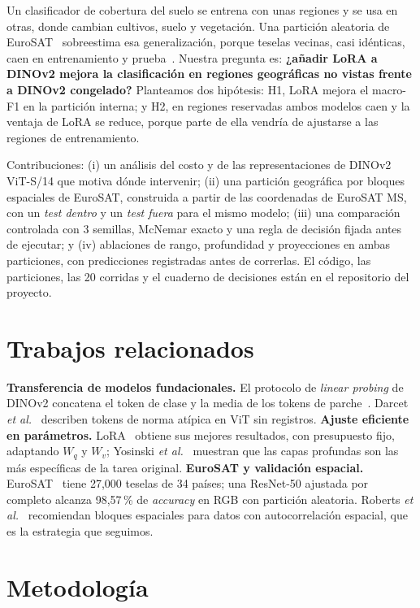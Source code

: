 \documentclass[conference,a4paper]{IEEEtran}
\begin{document}
Un clasificador de cobertura del suelo se entrena con unas regiones y se usa en otras, donde cambian cultivos, suelo y vegetación. Una partición aleatoria de EuroSAT~\cite{helber2019} sobreestima esa generalización, porque teselas vecinas, casi idénticas, caen en entrenamiento y prueba~\cite{roberts2017}. Nuestra pregunta es: \textbf{¿añadir LoRA a DINOv2 mejora la clasificación en regiones geográficas no vistas frente a DINOv2 congelado?} Planteamos dos hipótesis: H1, LoRA mejora el macro-F1 en la partición interna; y H2, en regiones reservadas ambos modelos caen y la ventaja de LoRA se reduce, porque parte de ella vendría de ajustarse a las regiones de entrenamiento.

Contribuciones: (i) un análisis del costo y de las representaciones de DINOv2 ViT-S/14 que motiva dónde intervenir; (ii) una partición geográfica por bloques espaciales de EuroSAT, construida a partir de las coordenadas de EuroSAT MS, con un \emph{test dentro} y un \emph{test fuera} para el mismo modelo; (iii) una comparación controlada con 3 semillas, McNemar exacto y una regla de decisión fijada antes de ejecutar; y (iv) ablaciones de rango, profundidad y proyecciones en ambas particiones, con predicciones registradas antes de correrlas. El código, las particiones, las 20 corridas y el cuaderno de decisiones están en el repositorio del proyecto.

\section{Trabajos relacionados}
\textbf{Transferencia de modelos fundacionales.} El protocolo de \emph{linear probing} de DINOv2 concatena el token de clase y la media de los tokens de parche~\cite{oquab2024}. Darcet \emph{et al.}~\cite{darcet2024} describen tokens de norma atípica en ViT sin registros. \textbf{Ajuste eficiente en parámetros.} LoRA~\cite{hu2022} obtiene sus mejores resultados, con presupuesto fijo, adaptando $W_q$ y $W_v$; Yosinski \emph{et al.}~\cite{yosinski2014} muestran que las capas profundas son las más específicas de la tarea original. \textbf{EuroSAT y validación espacial.} EuroSAT~\cite{helber2019} tiene 27{,}000 teselas de 34 países; una ResNet-50 ajustada por completo alcanza 98{,}57\,\% de \emph{accuracy} en RGB con partición aleatoria. Roberts \emph{et al.}~\cite{roberts2017} recomiendan bloques espaciales para datos con autocorrelación espacial, que es la estrategia que seguimos.

\section{Metodología}
\end{document}

